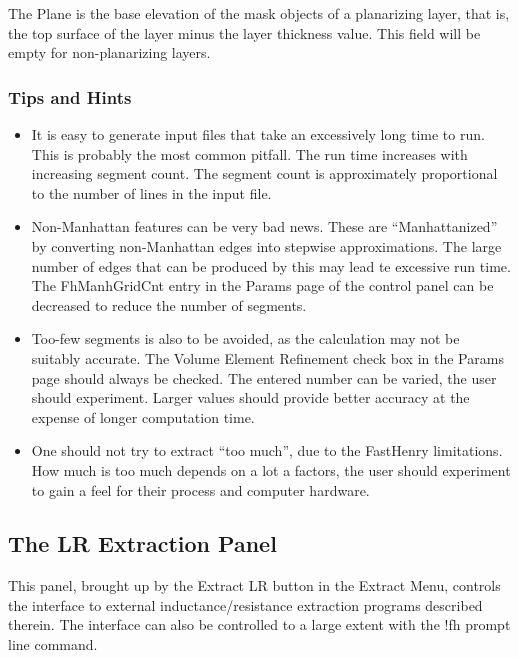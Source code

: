 The {\vt Plane} is the base elevation of the mask objects of a
planarizing layer, that is, the top surface of the layer minus the
layer thickness value.  This field will be empty for non-planarizing
layers.

\subsubsection{Tips and Hints}

\begin{itemize}
\item{It is easy to generate input files that take an excessively
long time to run.  This is probably the most common pitfall.  The
run time increases with increasing segment count.  The segment  
count is approximately proportional to the number of lines in the
input file.}

\item{Non-Manhattan features can be very bad news.  These are
``Manhattanized'' by converting non-Manhattan edges into stepwise
approximations.  The large number of edges that can be produced by
this may lead te excessive run time.  The {\cb FhManhGridCnt} entry in
the {\cb Params} page of the control panel can be decreased to reduce
the number of segments.}

\item{Too-few segments is also to be avoided, as the calculation may
not be suitably accurate.  The {\cb Volume Element Refinement} check
box in the {\cb Params} page should always be checked.  The entered
number can be varied, the user should experiment.  Larger values
should provide better accuracy at the expense of longer computation
time.}

\item{One should not try to extract ``too much'', due to the FastHenry
limitations.  How much is too much depends on a lot a factors, the
user should experiment to gain a feel for their process and computer
hardware.}
\end{itemize}


\subsection{The LR Extraction Panel}
\label{fhpanel}
This panel, brought up by the {\cb Extract LR} button in the {\cb
Extract Menu}, controls the interface to external
inductance/resistance extraction programs described therein.  The
interface can also be controlled to a large extent with the {\cb !fh}
prompt line command.

